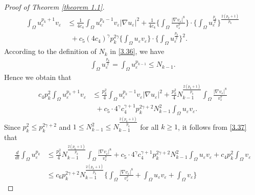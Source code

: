 \documentclass[12pt]{article}
\theoremstyle{plain}
\theoremstyle{definition}
\numberwithin{equation}{section}
\begin{document}
\begin{proof}[Proof of Theorem \ref{theorem 1.1}]
\begin{equation*}
    \begin{split}
        \int_\Omega u_\varepsilon^{p_k+1}v_\varepsilon&\leq\frac{1}{4c_4}\int_\Omega u_\varepsilon^{p_k-1}v_\varepsilon|\nabla u_\varepsilon|^2+\frac{1}{4c_4}\bigg\{\int_\Omega\frac{|\nabla v_\varepsilon|^8}{v_\varepsilon^7}\bigg\}\cdot\bigg\{\int_\Omega u_\varepsilon^{\frac{p_k}{2}}\bigg\}^{\frac{2(p_k+1)} {p_k}}\\
        &~~+c_5(4c_4)^{\gamma}p_k^{2\gamma}\bigg\{\int_\Omega u_\varepsilon v_\varepsilon\bigg\}\cdot\bigg\{\int_\Omega u_\varepsilon^{\frac{p_k}{2}}\bigg\}^{2}.
    \end{split}
\end{equation*}
According to the definition of $N_k$ in \eqref{3.36}, we  have
\begin{equation*}
    \begin{split}
        \int_\Omega u_\varepsilon^{\frac{p_k}{2}}=\int_\Omega u_\varepsilon^{p_{k-1}}\leq N_{k-1}.
    \end{split}
\end{equation*}
Hence we obtain that
\begin{equation*}
    \begin{split}
        c_4p_k^2\int_\Omega u_\varepsilon^{p_k+1}v_\varepsilon&\leq\frac{p_k^2}{4}\int_\Omega u_\varepsilon^{p_k-1}v_\varepsilon|\nabla u_\varepsilon|^2+\frac{p_k^2}{4}N_{k-1}^{\frac{2(p_k+1)} {p_k}}\int_\Omega\frac{|\nabla v_\varepsilon|^8}{v_\varepsilon^7}\\
        &~~+c_5\cdot4^\gamma c_4^{\gamma+1}p_k^{2\gamma+2} N_{k-1}^{2}\int_\Omega u_\varepsilon v_\varepsilon.
    \end{split}
\end{equation*}
Since $p_k^2\leq p_k^{2\gamma+2}$ and $1\leq N_{k-1}^2\leq N_{k-1}^{\frac{2(p_k+1)}{p_k}}$ for all $k\geq1$, it follows from \eqref{3.37} that
\begin{equation}\label{3.38}
\begin{split}
     \frac{d}{dt}\int_\Omega u_\varepsilon^{p_k}&\leq \frac{p_k^2}{4}N_{k-1}^{\frac{2(p_k+1)} {p_k}}\int_\Omega\frac{|\nabla v_\varepsilon|^8}{v_\varepsilon^7}+c_5\cdot4^\gamma c_4^{\gamma+1}p_k^{2\gamma+2} N_{k-1}^{2}\int_\Omega u_\varepsilon v_\varepsilon+c_4p_k^2\int_\Omega v_\varepsilon\\
     &\leq c_6 p_k^{2\gamma+2} N_{k-1}^{\frac{2(p_k+1)}{p_k}}\bigg\{\int_\Omega\frac{|\nabla v_\varepsilon|^8}{v_\varepsilon^7}+\int_\Omega u_\varepsilon v_\varepsilon+\int_\Omega v_\varepsilon\bigg\}

\end{split}
\end{equation}
\end{proof}
\end{document}
